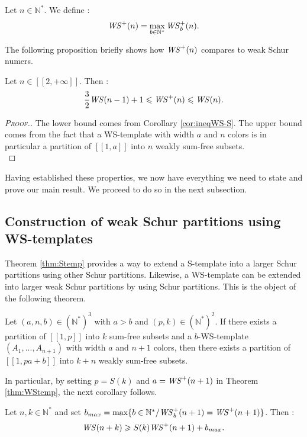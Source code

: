 \begin{definition}
Let \( n \in \mathbb{N}^*\). We define :
\[
\mathit{WS}^+(n)=\max_{b\in \mathbb{N}^*} \mathit{WS}_b^+(n).
\]
\end{definition}
The following proposition briefly shows how \(\mathit{WS}^+(n)\) compares to weak Schur numers.
\begin{proposition}
Let \(n \in [\![2, +\infty]\!]\). Then :
\[
\frac{3}{2} \mathit{WS} (n-1)+1 \leqslant \mathit{WS}^+(n) \leqslant \mathit{WS} (n).
\]
\end{proposition}

\begin{proof}[\textsc{Proof.}]
The lower bound comes from Corollary \ref{cor:ineqWS-S}.
The upper bound comes from the fact that a WS-template with width \(a\) and \(n\) colors is in particular a partition of
\([\![1, a]\!]\) into \(n\) weakly sum-free subsets. \\
\end{proof}

Having established these properties, we now have everything we need to state and prove our main result. We proceed to do so
in the next subsection.

\subsection{Construction of weak Schur partitions using WS-templates}
\label{ConstructionWS}

Theorem \ref{thm:Stemp} provides a way to extend a S-template into a larger Schur partitions using other Schur partitions. Likewise, a WS-template can 
be extended into larger weak Schur partitions by using Schur partitions. This is the object of the following theorem.

\begin{theorem}
\label{thm:WStemp}
Let \((a,n,b) \in (\mathbb{N}^*)^3\) with \(a > b\) and \( (p,k) \in (\mathbb{N}^*)^2\). If there exists a partition of \([\![1,p]\!]\)
into \(k\) sum-free subsets and a \(b\)-WS-template \((A_1,...,A_{n+1})\) with width \(a\) and \(n+1\) colors,
then there exists a partition of \([\![1, p a + b]\!]\) into \(k+n\) weakly sum-free subsets.
\end{theorem}

In particular, by setting \(p = S(k)\) and \(a = \mathit{WS}^+(n + 1)\) in Theorem \ref{thm:WStemp}, the next corollary follows.

\begin{corollary}
\label{cor:ineqWS+}
Let \(n,k \in \mathbb{N}^*\) and set \( b_{max} = \max \{b\in \mathbb{N}^*/ \mathit{WS}_b^+(n+1) = \mathit{WS}^+(n+1)\}\).
Then :
\[
\mathit{WS}(n+k) \geqslant S(k) \mathit{WS}^+(n+1)+b_{max}.
\]
\end{corollary}

